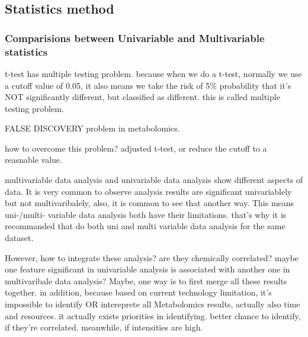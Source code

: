 

\subsection{Statistics method}
\subsubsection{Comparisions between Univariable and Multivariable statistics}
t-test has multiple testing problem. because when we do a t-test, normally we use a cutoff value of 0.05, it also means we take the risk of 5\% probability that it's NOT significantly different, but classified as different. this is called multiple testing problem. 

FALSE DISCOVERY problem in metabolomics.

how to overcome this problem? adjusted t-test, or reduce the cutoff to a reasnable value.

multivariable data analysis and univariable data analysis show different aspects of data. It is very common to observe analysis results are significant univariablely but not multivaribalely, also, it is common to see that another way. This means uni-/multi- variable data analysis both have their limitations. that's why it is recommanded that do both uni and multi variable data analysis for the same dataset.

However, how to integrate these analysis? are they chemically correlated? maybe one feature significant in univariable analysis is associated with another one in multivaribale data analysis? Maybe, one way is to first merge all these results together. in addition, because based on current technology limitation, it's impossible to identify OR intereprete all Metabolomics results, actually also time and resources. it actually exists priorities in identifying. better chance to identify, if they're correlated. meanwhile, if intensities are high.


